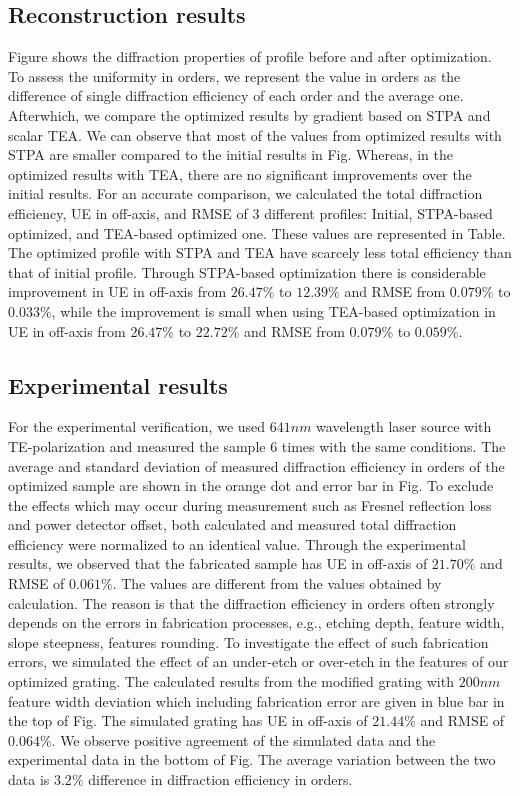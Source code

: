 \subsection{Reconstruction results}
Figure shows the diffraction properties of profile before and after optimization.
To assess the uniformity in orders, we represent the value in orders as the difference of single diffraction efficiency of each order and the average one.
Afterwhich, we compare the optimized results by gradient based on STPA and scalar TEA.
We can observe that most of the values from optimized results with STPA are smaller compared to the initial results in Fig. 
Whereas, in the optimized results with TEA, there are no significant improvements over the initial results. 
For an accurate comparison, we calculated the total diffraction efficiency, UE in off-axis, and RMSE of 3 different profiles: Initial, STPA-based optimized, and TEA-based optimized one. 
These values are represented in Table.
The optimized profile with STPA and TEA have scarcely less total efficiency than that of initial profile.
Through STPA-based optimization there is considerable improvement in UE in off-axis from $26.47\%$ to $12.39\%$ and RMSE from $0.079\%$ to $0.033\%$, while the improvement is small when using TEA-based optimization in  UE in off-axis from $26.47\%$ to $22.72\%$ and RMSE from $0.079\%$ to $0.059\%$.
\subsection{Experimental results}
For the experimental verification, we used $641 nm$ wavelength laser source with TE-polarization and measured the sample $6$ times with the same conditions.
The average and standard deviation of measured diffraction efficiency in orders of the optimized sample are shown in the orange dot and error bar in Fig.
To exclude the effects which may occur during measurement such as Fresnel reflection loss and power detector offset, both calculated and measured total diffraction efficiency were normalized to an identical value.
Through the experimental results, we observed that the fabricated sample has UE in off-axis of $21.70 \%$ and RMSE of $0.061 \%$.
The values are different from the values obtained by calculation.
The reason is that the diffraction efficiency in orders often strongly depends on the errors in fabrication processes, e.g., etching depth, feature width, slope steepness, features rounding.
To investigate the effect of such fabrication errors, we simulated the effect of an under-etch or over-etch in the features of our optimized grating.
The calculated results from the modified grating with $200nm$ feature width deviation which including fabrication error are given in blue bar in the top of Fig. 
The simulated grating has UE in off-axis of $21.44 \%$ and RMSE of $0.064 \%$.
We observe positive agreement of the simulated data and the experimental data in the bottom of Fig.
The average variation between the two data is $3.2 \%$ difference in diffraction efficiency in orders.

